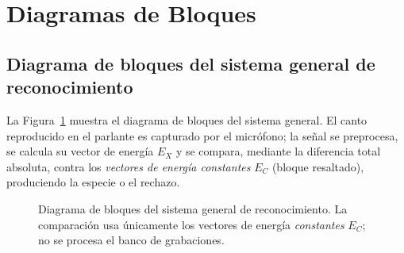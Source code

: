\documentclass[conference]{IEEEtran}
\begin{document}
\section{Diagramas de Bloques}\label{sec:diagramas}

\subsection{Diagrama de bloques del sistema general de reconocimiento}
La Figura~\ref{fig:sistema} muestra el diagrama de bloques del sistema general.
El canto reproducido en el parlante es capturado por el micrófono; la señal se
preprocesa, se calcula su vector de energía $E_X$ y se compara, mediante la
diferencia total absoluta, contra los \emph{vectores de energía constantes} $E_C$
(bloque resaltado), produciendo la especie o el rechazo.

\begin{figure}[!t]
\centering
{}
\caption{Diagrama de bloques del sistema general de reconocimiento. La
comparación usa únicamente los vectores de energía \emph{constantes} $E_C$; no se
procesa el banco de grabaciones.}
\label{fig:sistema}
\end{figure}
\end{document}

